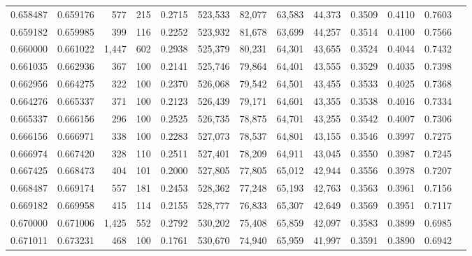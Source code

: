 \begin{tabular}{rrrrrrrrrrrrr}
0.658487 & 0.659176 &   577 & 215 &                                     0.2715 & 523,533 &  82,077 &  63,583 &  44,373 & 0.3509 & 0.4110 & 0.7603 \\
0.659182 & 0.659985 &   399 & 116 &                                     0.2252 & 523,932 &  81,678 &  63,699 &  44,257 & 0.3514 & 0.4100 & 0.7566 \\
0.660000 & 0.661022 & 1,447 & 602 &                                     0.2938 & 525,379 &  80,231 &  64,301 &  43,655 & 0.3524 & 0.4044 & 0.7432 \\
0.661035 & 0.662936 &   367 & 100 &                                     0.2141 & 525,746 &  79,864 &  64,401 &  43,555 & 0.3529 & 0.4035 & 0.7398 \\
0.662956 & 0.664275 &   322 & 100 &                                     0.2370 & 526,068 &  79,542 &  64,501 &  43,455 & 0.3533 & 0.4025 & 0.7368 \\
0.664276 & 0.665337 &   371 & 100 &                                     0.2123 & 526,439 &  79,171 &  64,601 &  43,355 & 0.3538 & 0.4016 & 0.7334 \\
0.665337 & 0.666156 &   296 & 100 &                                     0.2525 & 526,735 &  78,875 &  64,701 &  43,255 & 0.3542 & 0.4007 & 0.7306 \\
0.666156 & 0.666971 &   338 & 100 &                                     0.2283 & 527,073 &  78,537 &  64,801 &  43,155 & 0.3546 & 0.3997 & 0.7275 \\
0.666974 & 0.667420 &   328 & 110 &                                     0.2511 & 527,401 &  78,209 &  64,911 &  43,045 & 0.3550 & 0.3987 & 0.7245 \\
0.667425 & 0.668473 &   404 & 101 &                                     0.2000 & 527,805 &  77,805 &  65,012 &  42,944 & 0.3556 & 0.3978 & 0.7207 \\
0.668487 & 0.669174 &   557 & 181 &                                     0.2453 & 528,362 &  77,248 &  65,193 &  42,763 & 0.3563 & 0.3961 & 0.7156 \\
0.669182 & 0.669958 &   415 & 114 &                                     0.2155 & 528,777 &  76,833 &  65,307 &  42,649 & 0.3569 & 0.3951 & 0.7117 \\
0.670000 & 0.671006 & 1,425 & 552 &                                     0.2792 & 530,202 &  75,408 &  65,859 &  42,097 & 0.3583 & 0.3899 & 0.6985 \\
0.671011 & 0.673231 &   468 & 100 &                                     0.1761 & 530,670 &  74,940 &  65,959 &  41,997 & 0.3591 & 0.3890 & 0.6942 \\

\end{tabular}
